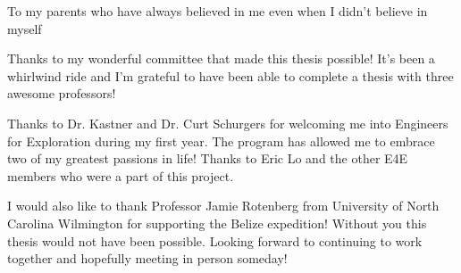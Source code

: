 %
\begin{frontmatter}

%
%
\makefrontmatter

%
%
%
%
%
%
\begin{dedication}
  To my parents who have always believed in me even when I didn't believe in myself
\end{dedication}

%
\tableofcontents
\listoffigures  %
\listoftables   %


\begin{acknowledgements}
Thanks to my wonderful committee that made this thesis possible! It's been a whirlwind ride and I'm grateful to have been able to complete a thesis with three awesome professors!

Thanks to Dr. Kastner and Dr. Curt Schurgers for welcoming me into Engineers for Exploration during my first year. The program has allowed me to embrace two of my greatest passions in life! Thanks to Eric Lo and the other E4E members who were a part of this project.

I would also like to thank Professor Jamie Rotenberg from University of North Carolina Wilmington for supporting the Belize expedition! Without you this thesis would not have been possible. Looking forward to continuing to work together and hopefully meeting in person someday!

\end{acknowledgements}


%
%
\begin{abstract}


\end{abstract}
\end{frontmatter}
